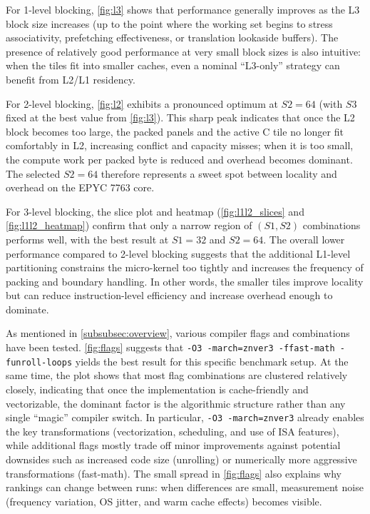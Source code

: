 \documentclass[unicode,10pt,a4paper,oneside,numbers=endperiod,openany]{scrartcl}
\begin{document}
For 1-level blocking, \autoref{fig:l3} shows that performance generally improves as the L3 block size increases (up to the point where the working set begins to stress associativity, prefetching effectiveness, or translation lookaside buffers). The presence of relatively good performance at very small block sizes is also intuitive: when the tiles fit into smaller caches, even a nominal “L3-only” strategy can benefit from L2/L1 residency.

For 2-level blocking, \autoref{fig:l2} exhibits a pronounced optimum at $S2 = 64$ (with $S3$ fixed at the best value from \autoref{fig:l3}). This sharp peak indicates that once the L2 block becomes too large, the packed panels and the active C tile no longer fit comfortably in L2, increasing conflict and capacity misses; when it is too small, the compute work per packed byte is reduced and overhead becomes dominant. The selected $S2 = 64$ therefore represents a sweet spot between locality and overhead on the EPYC 7763 core.

For 3-level blocking, the slice plot and heatmap (\autoref{fig:l1l2_slices} and \autoref{fig:l1l2_heatmap}) confirm that only a narrow region of $(S1,S2)$ combinations performs well, with the best result at $S1 = 32$ and $S2 = 64$. The overall lower performance compared to 2-level blocking suggests that the additional L1-level partitioning constrains the micro-kernel too tightly and increases the frequency of packing and boundary handling. In other words, the smaller tiles improve locality but can reduce instruction-level efficiency and increase overhead enough to dominate.

As mentioned in \ref{subsubsec:overview}, various compiler flags and combinations have been tested. \autoref{fig:flags} suggests that \verb|-O3 -march=znver3 -ffast-math -funroll-loops| yields the best result for this specific benchmark setup. At the same time, the plot shows that most flag combinations are clustered relatively closely, indicating that once the implementation is cache-friendly and vectorizable, the dominant factor is the algorithmic structure rather than any single “magic” compiler switch. In particular, \verb|-O3 -march=znver3| already enables the key transformations (vectorization, scheduling, and use of ISA features), while additional flags mostly trade off minor improvements against potential downsides such as increased code size (unrolling) or numerically more aggressive transformations (fast-math). The small spread in \autoref{fig:flags} also explains why rankings can change between runs: when differences are small, measurement noise (frequency variation, OS jitter, and warm cache effects) becomes visible.
\end{document}
